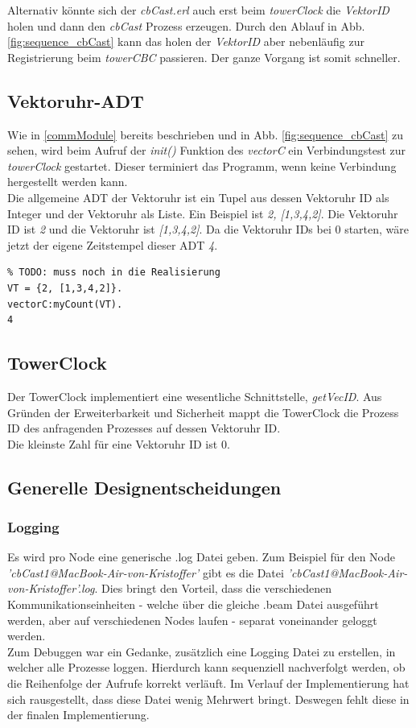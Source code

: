 Alternativ könnte sich der \textit{cbCast.erl} auch erst beim \textit{towerClock} die \textit{VektorID} holen und dann den \textit{cbCast} Prozess erzeugen. Durch den Ablauf in Abb. \ref{fig:sequence_cbCast} kann das holen der \textit{VektorID} aber nebenläufig zur Registrierung beim \textit{towerCBC} passieren. Der ganze Vorgang ist somit schneller.

\subsection{Vektoruhr-ADT}

Wie in \ref{commModule} bereits beschrieben und in Abb. \ref{fig:sequence_cbCast} zu sehen, wird beim Aufruf der \textit{init()} Funktion des \textit{vectorC} ein Verbindungstest zur \textit{towerClock} gestartet. Dieser terminiert das Programm, wenn keine Verbindung hergestellt werden kann.
\\Die allgemeine ADT der Vektoruhr ist ein Tupel aus dessen Vektoruhr ID als Integer und der Vektoruhr als Liste. Ein Beispiel ist \textit{{2, [1,3,4,2]}}. Die Vektoruhr ID ist \textit{2} und die Vektoruhr ist \textit{[1,3,4,2]}. Da die Vektoruhr IDs bei 0 starten, wäre jetzt der eigene Zeitstempel dieser ADT \textit{4}.

\begin{lstlisting}
% TODO: muss noch in die Realisierung
VT = {2, [1,3,4,2]}.
vectorC:myCount(VT).
4
\end{lstlisting}

\subsection{TowerClock}

Der TowerClock implementiert eine wesentliche Schnittstelle, \textit{getVecID}. Aus Gründen der Erweiterbarkeit und Sicherheit mappt die TowerClock die Prozess ID des anfragenden Prozesses auf dessen Vektoruhr ID.
\\Die kleinste Zahl für eine Vektoruhr ID ist 0.

\subsection{Generelle Designentscheidungen}

\subsubsection{Logging}

Es wird pro Node eine generische .log Datei geben. Zum Beispiel für den Node \textit{'cbCast1@MacBook-Air-von-Kristoffer'} gibt es die Datei \textit{'cbCast1@MacBook-Air-von-Kristoffer'.log}. Dies bringt den Vorteil, dass die verschiedenen Kommunikationseinheiten - welche über die gleiche .beam Datei ausgeführt werden, aber auf verschiedenen Nodes laufen - separat voneinander geloggt werden.
\\Zum Debuggen war ein Gedanke, zusätzlich eine Logging Datei zu erstellen, in welcher alle Prozesse loggen. Hierdurch kann sequenziell nachverfolgt werden, ob die Reihenfolge der Aufrufe korrekt verläuft. Im Verlauf der Implementierung hat sich rausgestellt, dass diese Datei wenig Mehrwert bringt. Deswegen fehlt diese in der finalen Implementierung.